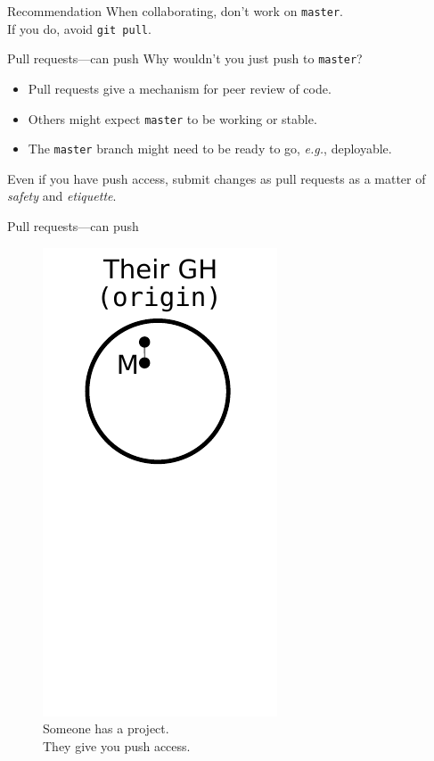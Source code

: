 \begin{frame}{Recommendation}
  \huge {
  When collaborating, don't work on \texttt{master}.
  \\
  If you do, avoid \texttt{git pull}.
}
\end{frame}

\begin{frame}{Pull requests---can push}
  Why wouldn't you just push to \texttt{master}?

  \begin{itemize}
    \item Pull requests give a mechanism for peer review of code.
    \item Others might expect \texttt{master} to be working or stable.
    \item The \texttt{master} branch might need to be ready to
          go, \emph{e.g.}, deployable.
  \end{itemize}

  Even if you have push access, submit changes as pull requests as a
  matter of \emph{safety} and \emph{etiquette}.
\end{frame}

\begin{frame}{Pull requests---can push}
  \begin{figure}
    \includegraphics{push_001.pdf}
    \\ Someone has a project.
    \\ They give you push access.
  \end{figure}
\end{frame}

